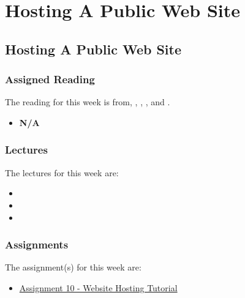 \clearpage

\renewcommand{\ChapTitle}{Hosting A Public Web Site}
\renewcommand{\SectionTitle}{Hosting A Public Web Site}

\chapter{\ChapTitle}

\section{\SectionTitle}

\subsection{Assigned Reading}

The reading for this week is from, \AgileBook, \EngSoftBook, \ProGitBook, and \LinuxBook.

\begin{itemize}
    \item \textbf{N/A}
\end{itemize}

\subsection{Lectures}

The lectures for this week are:

\begin{itemize}
    \item {}
    \item {}
    \item {}
\end{itemize}

\subsection{Assignments}

The assignment(s) for this week are:

\begin{itemize}
    \item \href{https://github.com/cu-cspb-3308-software-dev-summer-2024/lab-10-QuantumCompiler}{Assignment 10 - Website Hosting Tutorial}
\end{itemize}

